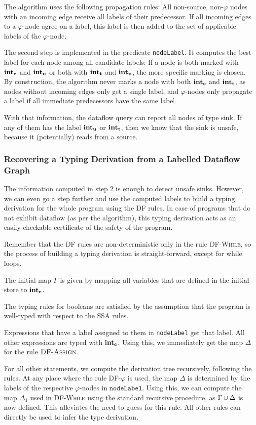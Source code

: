 The algorithm uses the following propagation rules:
All non-source, non-$\varphi$ nodes with an incoming edge receive all labels of their
predecessor.
If all incoming edges to a $\varphi$-node agree on a label, this label is then
added to the set of applicable labels of the $\varphi$-node.

The second step is implemented in the predicate \texttt{nodeLabel}.
It computes the best label for each node among all candidate labels:
If a node is both marked with $\textbf{int}_\textbf{c}$ and $\textbf{int}_\textbf{u}$ or both with $\textbf{int}_\textbf{t}$
and $\textbf{int}_\textbf{u}$, the more specific marking is chosen.
By construction, the algorithm never marks a node with both $\textbf{int}_\textbf{c}$ and $\textbf{int}_\textbf{t}$,
as nodes without incoming edges only get a single label, and $\varphi$-nodes only 
propagate a label if all immediate predecessors have the same label.

With that information, the dataflow query can report all nodes of type sink.
If any of them has the label $\textbf{int}_\textbf{u}$ or $\textbf{int}_\textbf{t}$, then we know that the sink
is unsafe, because it (potentially) reads from a source.

\subsubsection*{Recovering a Typing Derivation from a Labelled Dataflow Graph}
The information computed in step 2 is enough to detect unsafe sinks.
However, we can even go a step further and use the computed labels to build a
typing derivation for the whole program using the DF rules.
In case of programs that do not exhibit dataflow (as per the algorithm), this
typing derivation acts as an easily-checkable certificate of the safety of the program.

Remember that the DF rules are non-deterministic only in the rule \textsc{DF-While},
so the process of building a typing derivation is straight-forward, except for while loops.

The initial map $\Gamma$ is given by mapping all variables that are defined in 
the initial store to $\textbf{int}_\textbf{c}$.

The typing rules for booleans are satisfied by the assumption that the program 
is well-typed with respect to the SSA rules.

Expressions that have a label assigned to them in \texttt{nodeLabel} get that label.
All other expressions are typed with $\textbf{int}_\textbf{c}$.
Using this, we immediately get the map $\Delta$ for the rule $\textsc{DF-Assign}$.

For all other statements, we compute the derivation tree recursively,
following the rules.
At any place where the rule \textsc{DF-$\varphi$} is used, the map $\Delta$ 
is determined by the labels of the respective $\varphi$-nodes in $\texttt{nodeLabel}$.
Using this, we can compute the map $\Delta_1$ used in \textsc{DF-While} using the
standard recursive procedure, as $\Gamma \cup \Delta$ is now defined.
This alleviates the need to guess for this rule.
All other rules can directly be used to infer the type derivation.

